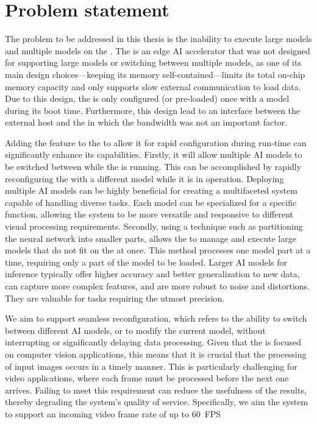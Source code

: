 \section{Problem statement}
The problem to be addressed in this thesis is the inability to execute large models and multiple models on the \graicore{}.
The \graicore{} is an edge AI accelerator that was not designed for supporting large models or switching between multiple models, as one of its main design choices---keeping its memory self-contained---limits its total on-chip memory capacity and only supports slow external communication to load data.
Due to this design, the \graicore{} is only configured (or pre-loaded) once with a model during its boot time.
Furthermore, this design lead to an interface between the external host and the \graicore{} in which the bandwidth was not an important factor.

Adding the feature to the \graicore{} to allow it for rapid configuration during run-time can significantly enhance its capabilities.
Firstly, it will allow multiple AI models to be switched between while the \graicore{} is running.
This can be accomplished by rapidly reconfiguring the \graicore{} with a different model while it is in operation.
Deploying multiple AI models can be highly beneficial for creating a multifaceted system capable of handling diverse tasks.
Each model can be specialized for a specific function, allowing the system to be more versatile and responsive to different visual processing requirements.
Secondly, using a technique such as partitioning the neural network into smaller parts, allows the \graicore{} to manage and execute large models that do not fit on the \graicore{} at once.
This method processes one model part at a time, requiring only a part of the model to be loaded.
Larger AI models for inference typically offer higher accuracy and better generalization to new data, can capture more complex features, and are more robust to noise and distortions.
They are valuable for tasks requiring the utmost precision.

We aim to support seamless reconfiguration, which refers to the ability to switch between different AI models, or to modify the current model, without interrupting or significantly delaying data processing.
Given that the \graicore{} is focused on computer vision applications, this means that it is crucial that the processing of input images occurs in a timely manner.
This is particularly challenging for video applications, where each frame must be processed before the next one arrives.
Failing to meet this requirement can reduce the usefulness of the results, thereby degrading the system's quality of service.
Specifically, we aim the system to support an incoming video frame rate of up to \SI{60}{FPS}

